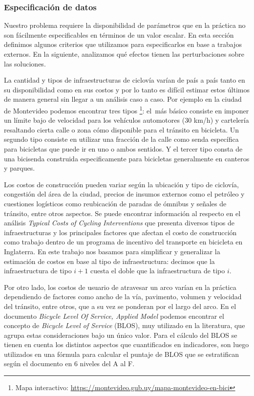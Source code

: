 \documentclass{article}
\begin{document}
  \subsubsection{Especificación de datos}

  Nuestro problema requiere la disponibilidad de parámetros que en la práctica no son fácilmente especificables en términos de un valor escalar. En esta sección definimos algunos criterios que utilizamos para especificarlos en base a trabajos externos. En la siguiente, analizamos qué efectos tienen las perturbaciones sobre las soluciones.

  La cantidad y tipos de infraestructuras de ciclovía varían de país a país tanto en su disponibilidad como en sus costos y por lo tanto es difícil estimar estos últimos de manera general sin llegar a un análisis caso a caso. Por ejemplo en la ciudad de Montevideo podemos encontrar tres tipos \footnote{Mapa interactivo: \url{https://montevideo.gub.uy/mapa-montevideo-en-bici}}: el más básico consiste en imponer un límite bajo de velocidad para los vehículos automotores (30 km/h) y cartelería resaltando cierta calle o zona cómo disponible para el tránsito en bicicleta. Un segundo tipo consiste en utilizar una fracción de la calle como senda específica para bicicletas que puede ir en uno o ambos sentidos. Y el tercer tipo consta de una bicisenda construida especificamente para bicicletas generalmente en canteros y parques.

  Los costos de construcción pueden variar según la ubicación y tipo de ciclovía, congestión del área de la ciudad, precios de insumos externos como el petróleo y cuestiones logísticos como reubicación de paradas de ómnibus y señales de tránsito, entre otros aspectos. Se puede encontrar información al respecto en el análisis {\it Typical Costs of Cycling Interventions} \cite{typicalcostsofcylcing} que presenta diversos tipos de infraestructuras y los principales factores que afectan el costo de construcción como trabajo dentro de un programa de incentivo del transporte en bicicleta en Inglaterra. En este trabajo nos basamos para simplificar y generalizar la estimación de costos en base al tipo de infraestructura: decimos que la infraestructura de tipo $i+1$ cuesta el doble que la infraestructura de tipo $i$.

  Por otro lado, los costos de usuario de atravesar un arco varían en la práctica dependiendo de factores como ancho de la vía, pavimento, volumen y velocidad del tránsito, entre otros, que a su vez se ponderan por el largo del arco. En el documento {\it Bicycle Level Of Service, Applied Model} \cite{blos2007} podemos encontrar el concepto de {\it Bicycle Level of Service} (BLOS), muy utilizado en la literatura, que agrupa estas consideraciones bajo un único valor. Para el cálculo del BLOS se tienen en cuenta los distintos aspectos que cuantificados en indicadores, son luego utilizados en una fórmula para calcular el puntaje de BLOS que se estratifican según el documento en 6 niveles del A al F.
\end{document}
